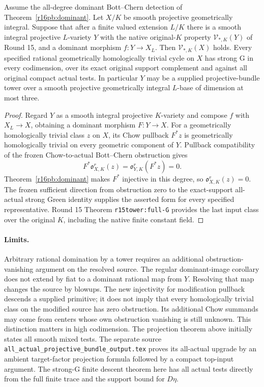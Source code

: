\begin{corollary}
\label{r16fc:dominant-towers}
Assume the all-degree dominant Bott--Chern detection of
Theorem~\ref{r16pb:dominant}.  Let $X/K$ be smooth projective
geometrically integral.  Suppose that after a finite valued extension
$L/K$ there is a smooth integral projective $L$-variety $Y$ with the
native original-$K$ property $\mathcal V_{*,K}(Y)$ of Round 15, and
a dominant morphism $f:Y\to X_L$.  Then
$\mathcal V_{*,K}(X)$ holds.  Every specified rational geometrically
homologically trivial cycle on $X$ has strong G in every codimension,
over its exact original support complement and against all original
compact actual tests.  In particular $Y$ may be a supplied
projective-bundle tower over a smooth projective geometrically integral
$L$-base of dimension at most three.
\end{corollary}

\begin{proof}
Regard $Y$ as a smooth integral projective $K$-variety and compose
$f$ with $X_L\to X$, obtaining a dominant morphism $F:Y\to X$.
For a geometrically homologically trivial class $z$ on $X$, its
Chow pullback $F^*z$ is geometrically homologically trivial on every
geometric component of $Y$.  Pullback compatibility of the frozen
Chow-to-actual Bott--Chern obstruction gives
\[
 F^*\mathfrak o_{X,K}^r(z)
       =\mathfrak o_{Y,K}^r(F^*z)=0.
\]
Theorem~\ref{r16pb:dominant} makes $F^*$ injective in this degree,
so $\mathfrak o_{X,K}^r(z)=0$.  The frozen sufficient direction
from obstruction zero to the exact-support all-actual strong Green
identity supplies the asserted form for every specified representative.
Round 15 Theorem \texttt{r15tower:full-G} provides the last input
class over the original $K$, including the native finite constant field.
\end{proof}

\paragraph{Limits.}
Arbitrary rational domination by a tower requires an additional
obstruction-vanishing argument on the resolved source.
The regular dominant-image corollary does not extend by fiat to a
dominant rational map from $Y$.  Resolving that map changes the source
by blowups.  The new injectivity for modification pullback descends a
supplied primitive; it does not imply that every homologically trivial
class on the modified source has zero obstruction.  Its additional
Chow summands may come from centers whose own obstruction vanishing
is still unknown.  This distinction matters in high codimension.
The projection theorem above initially states all smooth mixed tests.
The separate source
\texttt{all\_actual\_projective\_bundle\_output.tex} proves its
all-actual upgrade by an ambient target-factor projection formula
followed by a compact top-input argument.  The strong-G finite descent
theorem here has all actual tests directly from the full finite trace
and the support bound for $D\eta$.
